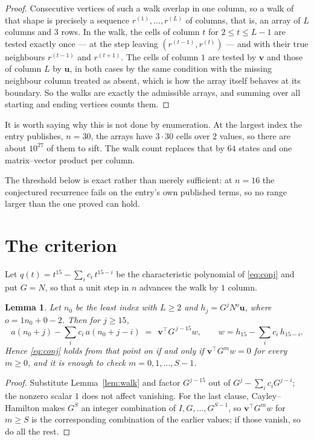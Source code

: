 \documentclass[11pt,a4paper]{article}
\theoremstyle{plain}
\newtheorem{lemma}[theorem]{Lemma}
\theoremstyle{definition}
\begin{document}
\begin{proof}
Consecutive vertices of such a walk overlap in one column, so a walk of that shape is
precisely a sequence $r^{(1)},\dots,r^{(L)}$ of columns, that is, an array of $L$ columns
and $3$ rows. In the walk, the cells of column $t$ for $2\le t\le L-1$ are tested
exactly once --- at the step leaving $(r^{(t-1)},r^{(t)})$ --- and with their true
neighbours $r^{(t-1)}$ and $r^{(t+1)}$. The cells of column $1$ are tested by
$\mathbf{v}$ and those of column $L$ by $\mathbf{u}$, in both cases by the same condition
with the missing neighbour column treated as absent, which is how the array itself behaves at
its boundary. So the walks are exactly the admissible arrays, and summing over all starting
and ending vertices counts them.
\end{proof}


It is worth saying why this is not done by enumeration. At the largest index the entry
publishes, $n=30$, the arrays have $3\cdot30$ cells over
$2$ values, so there are about $10^{27}$ of them to sift. The
walk count replaces that by $64$ states and one matrix--vector product per column.

The threshold below is exact rather than merely sufficient: at $n=16$ the conjectured
recurrence fails on the entry's own published terms, so no range larger than the one proved
can hold.
\section{The criterion}

Let $q(t)=t^{15}-\sum_i c_i\,t^{15-i}$ be the characteristic polynomial of
\eqref{eq:conj} and put $G=N$, so that a unit step in $n$ advances the walk by
$1$ column.

\begin{lemma}\label{lem:crit}
Let $n_0$ be the least index with $L\ge2$ and $h_j=G^{j}N^{o}\mathbf{u}$, where
$o=1n_0+0-2$. Then for $j\ge15$,
\[
a(n_0+j)-\sum_i c_i\,a(n_0+j-i)\;=\;\,\mathbf{v}^{\!\top}G^{\,j-15}w,
\qquad w=h_{15}-\sum_i c_i\,h_{15-i} .
\]
Hence \eqref{eq:conj} holds from that point on if and only if
$\mathbf{v}^{\!\top}G^{m}w=0$ for every $m\ge0$, and it is enough to check
$m=0,1,\dots,S-1$.
\end{lemma}

\begin{proof}
Substitute Lemma~\ref{lem:walk} and factor $G^{j-15}$ out of
$G^{j}-\sum_ic_iG^{j-i}$; the nonzero scalar $1$ does not affect
vanishing. For the last clause, Cayley--Hamilton makes $G^{S}$ an integer combination of
$I,G,\dots,G^{S-1}$, so $\mathbf{v}^{\!\top}G^{m}w$ for $m\ge S$ is the corresponding
combination of the earlier values; if those vanish, so do all the rest.
\end{proof}
\end{document}
